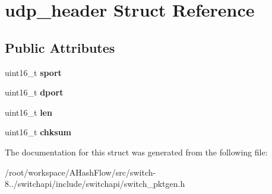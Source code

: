 \hypertarget{structudp__header}{\section{udp\+\_\+header Struct Reference}
\label{structudp__header}
}
\subsection*{Public Attributes}
\begin{DoxyCompactItemize}
\item 
\hypertarget{structudp__header_afd67a1ad1aeb3fe59d6eff73e97754b2}{uint16\+\_\+t {\bfseries sport}}\label{structudp__header_afd67a1ad1aeb3fe59d6eff73e97754b2}

\item 
\hypertarget{structudp__header_a8740ee989d7d57e67ef81673cc7a4267}{uint16\+\_\+t {\bfseries dport}}\label{structudp__header_a8740ee989d7d57e67ef81673cc7a4267}

\item 
\hypertarget{structudp__header_adba35402eefc8744d263aa98727a9c67}{uint16\+\_\+t {\bfseries len}}\label{structudp__header_adba35402eefc8744d263aa98727a9c67}

\item 
\hypertarget{structudp__header_adbd2086abf7dffba8fb959d498ee977b}{uint16\+\_\+t {\bfseries chksum}}\label{structudp__header_adbd2086abf7dffba8fb959d498ee977b}

\end{DoxyCompactItemize}


The documentation for this struct was generated from the following file\+:\begin{DoxyCompactItemize}
\item 
/root/workspace/\+A\+Hash\+Flow/src/switch-\/8../switchapi/include/switchapi/switch\+\_\+pktgen.\+h\end{DoxyCompactItemize}
